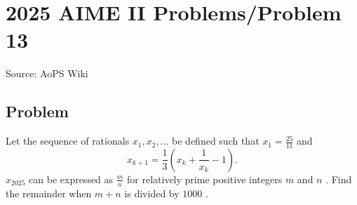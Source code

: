 \documentclass[12pt]{article}
\begin{document}
\section*{{2025 AIME II Problems/Problem 13}}
Source: AoPS Wiki

\subsection*{Problem}
Let the sequence of rationals $x_1,x_2,\dots$ be defined such that $x_1=\frac{25}{11}$ and \[x_{k+1}=\frac{1}{3}\left(x_k+\frac{1}{x_k}-1\right).\] $x_{2025}$ can be expressed as $\frac{m}{n}$ for relatively prime positive integers $m$ and $n$ . Find the remainder when $m+n$ is divided by $1000$ .
\end{document}
